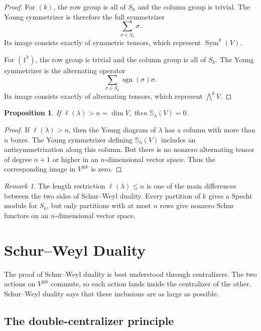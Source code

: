 \documentclass[12pt,a4paper]{article}
\newtheorem{proposition}[theorem]{Proposition}
\theoremstyle{definition}
\theoremstyle{remark}
\newtheorem{remark}[theorem]{Remark}
\newcommand{\Sym}{\operatorname{Sym}}
\newcommand{\sgn}{\operatorname{sgn}}
\newcommand{\Schur}[1]{\mathbb{S}_{#1}}
\begin{document}
\begin{proof}
For \((k)\), the row group is all of \(S_k\) and the column group is trivial.
The Young symmetrizer is therefore the full symmetrizer
\[
\sum_{\sigma\in S_k}\sigma.
\]
Its image consists exactly of symmetric tensors, which represent
\(\Sym^k(V)\).

For \((1^k)\), the row group is trivial and the column group is all of
\(S_k\).  The Young symmetrizer is the alternating operator
\[
\sum_{\sigma\in S_k}\sgn(\sigma)\sigma.
\]
Its image consists exactly of alternating tensors, which represent
\(\bigwedge^k V\).
\end{proof}

\begin{proposition}
If \(\ell(\lambda)>n=\dim V\), then \(\Schur{\lambda}(V)=0\).
\end{proposition}

\begin{proof}
If \(\ell(\lambda)>n\), then the Young diagram of \(\lambda\) has a column
with more than \(n\) boxes.  The Young symmetrizer defining
\(\Schur{\lambda}(V)\) includes an antisymmetrization along this column.  But
there is no nonzero alternating tensor of degree \(n+1\) or higher in an
\(n\)-dimensional vector space.  Thus the corresponding image in
\(V^{\otimes k}\) is zero.
\end{proof}

\begin{remark}
The length restriction \(\ell(\lambda)\le n\) is one of the main differences
between the two sides of Schur--Weyl duality.  Every partition of \(k\) gives
a Specht module for \(S_k\), but only partitions with at most \(n\) rows give
nonzero Schur functors on an \(n\)-dimensional vector space.
\end{remark}

\section{Schur--Weyl Duality}

The proof of Schur--Weyl duality is best understood through centralizers.
The two actions on \(V^{\otimes k}\) commute, so each action lands inside the
centralizer of the other.  Schur--Weyl duality says that these inclusions are
as large as possible.

\subsection{The double-centralizer principle}
\end{document}
